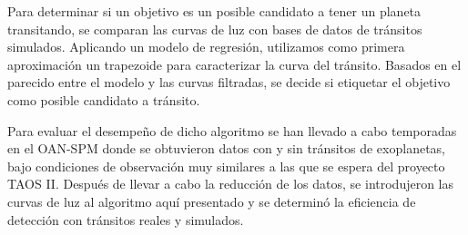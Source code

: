 Para determinar si un objetivo es un posible candidato a tener un planeta transitando, se comparan las curvas de luz con bases de datos de tránsitos simulados. Aplicando un modelo de regresión, utilizamos como primera aproximación un trapezoide para caracterizar la curva del tránsito. Basados en el parecido entre el modelo y las curvas filtradas, se decide si etiquetar el objetivo como posible candidato a tránsito.

Para evaluar el desempeño de dicho algoritmo se han llevado a cabo temporadas en el OAN-SPM donde se obtuvieron datos con y sin tránsitos de exoplanetas, bajo condiciones de observación muy similares a las que se espera del proyecto TAOS II. Después de llevar a cabo la reducción de los datos, se introdujeron las curvas de luz al algoritmo aquí presentado y se determinó la eficiencia de detección con tránsitos reales y simulados.
